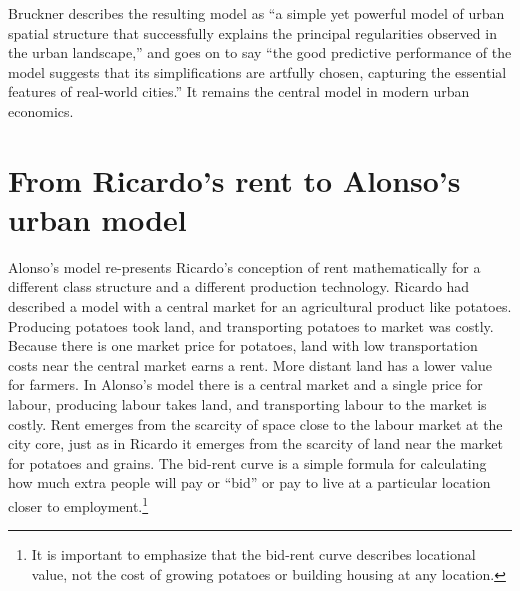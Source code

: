  Bruckner \cite{bruecknerStructureUrbanEquilibria1987} describes the resulting model as ``a simple yet powerful model of urban spatial structure that successfully explains the principal regularities observed in the urban landscape,'' and goes on to say ``the good predictive performance of the model suggests that its simplifications are artfully chosen, capturing the essential features of real-world cities.'' It remains the central model in modern urban economics. 




\section{From Ricardo's rent to Alonso's urban model}

Alonso's model re-presents Ricardo's conception of rent mathematically for a different class structure and a different production technology. Ricardo had described a model with a central market for an agricultural product like potatoes. Producing potatoes took land, and transporting potatoes to market was costly. Because there is one market price for potatoes, land with low transportation costs near the central market earns a rent. More distant land has a lower value for farmers. In Alonso's model there is a central market and a single price for labour, producing labour takes land, and transporting labour to the market is costly. Rent emerges from the scarcity of space close to the labour market at the city core, just as in Ricardo it emerges from the scarcity of land near the market for potatoes and grains. The \gls{bid-rent curve} is a simple formula for calculating how much extra people will pay or ``bid'' or pay to live at a particular location closer to employment.\footnote{It is important to emphasize that the bid-rent curve describes locational value, not the cost of growing potatoes or building housing at any location.}   


